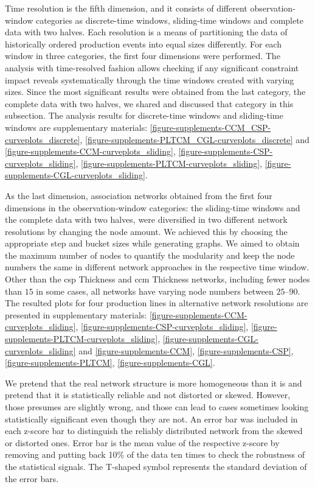Time resolution is the fifth dimension, and it consists of different observation-window categories as discrete-time windows, sliding-time windows and complete data with two halves. Each resolution is a means of partitioning the data of historically ordered production events into equal sizes differently. For each window in three categories, the first four dimensions were performed. The analysis with time-resolved fashion allows checking if any significant constraint impact reveals systematically through the time windows created with varying sizes. Since the most significant results were obtained from the last category, the complete data with two halves, we shared and discussed that category in this subsection. The analysis results for discrete-time windows and sliding-time windows are supplementary materials: \ref{figure-supplements-CCM_CSP-curveplots_discrete}, \ref{figure-supplements-PLTCM_CGL-curveplots_discrete} and \ref{figure-supplements-CCM-curveplots_sliding}, \ref{figure-supplements-CSP-curveplots_sliding}, \ref{figure-supplements-PLTCM-curveplots_sliding}, \ref{figure-supplements-CGL-curveplots_sliding}.

As the last dimension, association networks obtained from the first four dimensions in the observation-window categories: the sliding-time windows and the complete data with two halves, were diversified in two different network resolutions by changing the node amount. We achieved this by choosing the appropriate step and bucket sizes while generating graphs. We aimed to obtain the maximum number of nodes to quantify the modularity and keep the node numbers the same in different network approaches in the respective time window. Other than the \acs{csp} Thickness and \acs{ccm} Thickness networks, including fewer nodes than $15$ in some cases, all networks have varying node numbers between $25$--$90$. The resulted plots for four production lines in alternative network resolutions are presented in supplementary materials: \ref{figure-supplements-CCM-curveplots_sliding}, \ref{figure-supplements-CSP-curveplots_sliding}, \ref{figure-supplements-PLTCM-curveplots_sliding}, \ref{figure-supplements-CGL-curveplots_sliding} and \ref{figure-supplements-CCM}, \ref{figure-supplements-CSP}, \ref{figure-supplements-PLTCM}, \ref{figure-supplements-CGL}.

We pretend that the real network structure is more homogeneous than it is and pretend that it is statistically reliable and not distorted or skewed. However, those presumes are slightly wrong, and those can lead to cases sometimes looking statistically significant even though they are not. An error bar was included in each z-score bar to distinguish the reliably distributed network from the skewed or distorted ones. Error bar is the mean value of the respective z-score by removing and putting back 10\% of the data ten times to check the robustness of the statistical signals. The T-shaped symbol represents the standard deviation of the error bars.

